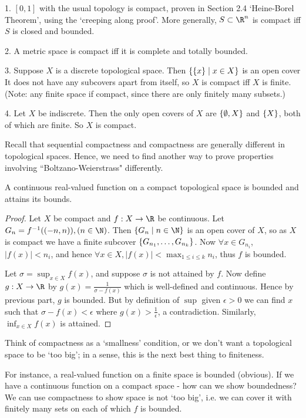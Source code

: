 \begin{example}

1. $[0,1]$ with the usual topology is compact, proven in Section 2.4 `Heine-Borel Theorem', using the `creeping along proof'. More generally, $S\subset \R^n$ is compact iff $S$ is closed and bounded.

2. A metric space is compact iff it is complete and totally bounded.

3. Suppose $X$ is a discrete topological space. Then $\{\{x\}\mid x\in X\}$ is an open cover It does not have any subcovers apart from itself, so $X$ is compact iff $X$ is finite. (Note: any finite space if compact, since there are only finitely many subsets.)

4. Let $X$ be indiscrete. Then the only open covers of $X$ are $\{\emptyset, X\}$ and $\{X\}$, both of which are finite. So $X$ is compact.

\end{example}

Recall that sequential compactness and compactness are generally different in topological spaces. Hence, we need to find another way to prove properties involving ``Boltzano-Weierstrass" differently.
\begin{theorem}                           %
A continuous real-valued function on a compact topological space is bounded and attains its bounds.
\end{theorem}   

\begin{proof}
Let $X$ be compact and $f:X\rightarrow \R$ be continuous. Let $G_n = f\inv((-n,n)) , (n\in \N)$. Then $\Set{G_n}{n\in \N}$ is an open cover of $X$, so as $X$ is compact we have a finite subcover $\{G_{n_1},\dots, G_{n_k}\}$. Now $\forall x\in G_{n_i}$, $|f(x)| < n_i$, and hence $\forall x\in X, |f(x)| < \max_{1\le i \le k} n_i$, thus $f$ is bounded.

Let $\sigma = \sup_{x\in X} f(x)$, and suppose $\sigma$ is not attained by $f$. Now define $g: X\rightarrow \R$ by $g(x) = \frac{1}{\sigma-f(x)}$ which is well-defined and continuous. Hence by previous part, $g$ is bounded. But by definition of $\sup$ given $\epsilon>0$ we can find $x$ such that $\sigma - f(x)< \epsilon$ where $g(x) > \frac{1}{\epsilon}$, a contradiction. Similarly, $\inf_{x\in X} f(x)$ is attained.
\end{proof}

\begin{remark}
Think of compactness as a `smallness' condition, or we don't want a topological space to be `too big'; in a sense, this is the next best thing to finiteness.

For instance, a real-valued function on a finite space is bounded (obvious). If we have a continuous function on a compact space - how can we show boundedness? We can use compactness to show space is not `too big', i.e. we can cover it with finitely many sets on each of which $f$ is bounded.
\end{remark}
    
